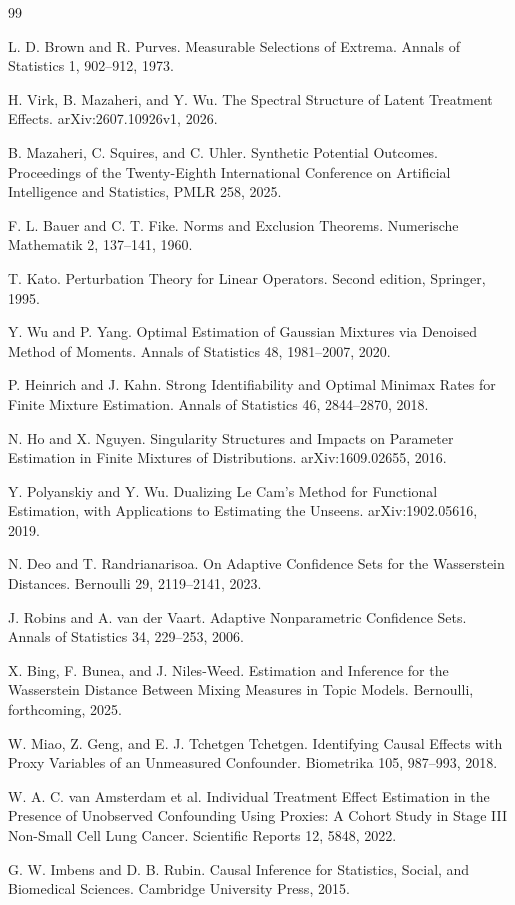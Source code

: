 \documentclass{article}
\begin{document}
\begin{thebibliography}{99}

   L. D. Brown and R. Purves. Measurable Selections of Extrema. Annals of Statistics 1, 902--912, 1973.

   H. Virk, B. Mazaheri, and Y. Wu. The Spectral Structure of Latent Treatment Effects. arXiv:2607.10926v1, 2026.

   B. Mazaheri, C. Squires, and C. Uhler. Synthetic Potential Outcomes. Proceedings of the Twenty-Eighth International Conference on Artificial Intelligence and Statistics, PMLR 258, 2025.

   F. L. Bauer and C. T. Fike. Norms and Exclusion Theorems. Numerische Mathematik 2, 137--141, 1960.

   T. Kato. Perturbation Theory for Linear Operators. Second edition, Springer, 1995.

   Y. Wu and P. Yang. Optimal Estimation of Gaussian Mixtures via Denoised Method of Moments. Annals of Statistics 48, 1981--2007, 2020.

   P. Heinrich and J. Kahn. Strong Identifiability and Optimal Minimax Rates for Finite Mixture Estimation. Annals of Statistics 46, 2844--2870, 2018.

   N. Ho and X. Nguyen. Singularity Structures and Impacts on Parameter Estimation in Finite Mixtures of Distributions. arXiv:1609.02655, 2016.

   Y. Polyanskiy and Y. Wu. Dualizing Le Cam's Method for Functional Estimation, with Applications to Estimating the Unseens. arXiv:1902.05616, 2019.

   N. Deo and T. Randrianarisoa. On Adaptive Confidence Sets for the Wasserstein Distances. Bernoulli 29, 2119--2141, 2023.

   J. Robins and A. van der Vaart. Adaptive Nonparametric Confidence Sets. Annals of Statistics 34, 229--253, 2006.

   X. Bing, F. Bunea, and J. Niles-Weed. Estimation and Inference for the Wasserstein Distance Between Mixing Measures in Topic Models. Bernoulli, forthcoming, 2025.

   W. Miao, Z. Geng, and E. J. Tchetgen Tchetgen. Identifying Causal Effects with Proxy Variables of an Unmeasured Confounder. Biometrika 105, 987--993, 2018.

   W. A. C. van Amsterdam et al. Individual Treatment Effect Estimation in the Presence of Unobserved Confounding Using Proxies: A Cohort Study in Stage III Non-Small Cell Lung Cancer. Scientific Reports 12, 5848, 2022.

   G. W. Imbens and D. B. Rubin. Causal Inference for Statistics, Social, and Biomedical Sciences. Cambridge University Press, 2015.

\end{thebibliography}
\end{document}

